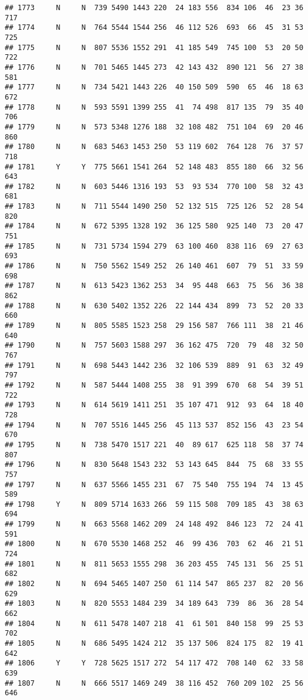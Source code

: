 \documentclass[]{article}
\begin{document}
\begin{verbatim}
## 1773     N     N  739 5490 1443 220  24 183 556  834 106  46  23 36  717
## 1774     N     N  764 5544 1544 256  46 112 526  693  66  45  31 53  725
## 1775     N     N  807 5536 1552 291  41 185 549  745 100  53  20 50  722
## 1776     N     N  701 5465 1445 273  42 143 432  890 121  56  27 38  581
## 1777     N     N  734 5421 1443 226  40 150 509  590  65  46  18 63  672
## 1778     N     N  593 5591 1399 255  41  74 498  817 135  79  35 40  706
## 1779     N     N  573 5348 1276 188  32 108 482  751 104  69  20 46  860
## 1780     N     N  683 5463 1453 250  53 119 602  764 128  76  37 57  718
## 1781     Y     Y  775 5661 1541 264  52 148 483  855 180  66  32 56  643
## 1782     N     N  603 5446 1316 193  53  93 534  770 100  58  32 43  681
## 1783     N     N  711 5544 1490 250  52 132 515  725 126  52  28 54  820
## 1784     N     N  672 5395 1328 192  36 125 580  925 140  73  20 47  751
## 1785     N     N  731 5734 1594 279  63 100 460  838 116  69  27 63  693
## 1786     N     N  750 5562 1549 252  26 140 461  607  79  51  33 59  698
## 1787     N     N  613 5423 1362 253  34  95 448  663  75  56  36 38  862
## 1788     N     N  630 5402 1352 226  22 144 434  899  73  52  20 33  660
## 1789     N     N  805 5585 1523 258  29 156 587  766 111  38  21 46  640
## 1790     N     N  757 5603 1588 297  36 162 475  720  79  48  32 50  767
## 1791     N     N  698 5443 1442 236  32 106 539  889  91  63  32 49  797
## 1792     N     N  587 5444 1408 255  38  91 399  670  68  54  39 51  722
## 1793     N     N  614 5619 1411 251  35 107 471  912  93  64  18 40  728
## 1794     N     N  707 5516 1445 256  45 113 537  852 156  43  23 54  670
## 1795     N     N  738 5470 1517 221  40  89 617  625 118  58  37 74  807
## 1796     N     N  830 5648 1543 232  53 143 645  844  75  68  33 55  757
## 1797     N     N  637 5566 1455 231  67  75 540  755 194  74  13 45  589
## 1798     Y     N  809 5714 1633 266  59 115 508  709 185  43  38 63  694
## 1799     N     N  663 5568 1462 209  24 148 492  846 123  72  24 41  591
## 1800     N     N  670 5530 1468 252  46  99 436  703  62  46  21 51  724
## 1801     N     N  811 5653 1555 298  36 203 455  745 131  56  25 51  682
## 1802     N     N  694 5465 1407 250  61 114 547  865 237  82  20 56  629
## 1803     N     N  820 5553 1484 239  34 189 643  739  86  36  28 54  662
## 1804     N     N  611 5478 1407 218  41  61 501  840 158  99  25 53  702
## 1805     N     N  686 5495 1424 212  35 137 506  824 175  82  19 41  642
## 1806     Y     Y  728 5625 1517 272  54 117 472  708 140  62  33 58  639
## 1807     N     N  666 5517 1469 249  38 116 452  760 209 102  25 56  646

\end{verbatim}
\end{document}
